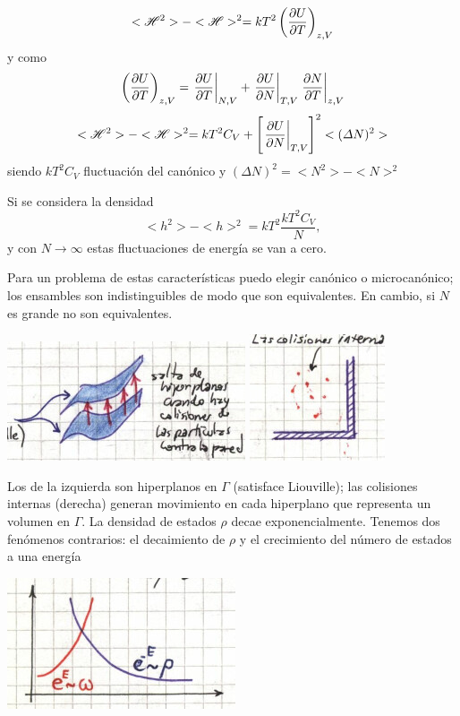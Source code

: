 \documentclass[10pt,oneside]{CBFT_book}
\begin{document}
\[
	<\mathscr{H}^2> - <\mathscr{H}>^2 = kT^2 \left( \frac{\partial^{\hspace{-0.05em}} {U}}{\partial {T}^{\hspace{-0.05em}}} \right)_{z,V}
\]
y como 
\[
	\left( \frac{\partial^{\hspace{-0.05em}} {U}}{\partial {T}^{\hspace{-0.05em}}} \right)_{z,V} = \left.\frac{\partial^{\hspace{-0.05em}} {U}}{\partial {T}^{\hspace{-0.05em}}}\right|_{N,V} + \left.\frac{\partial^{\hspace{-0.05em}} {U}}{\partial {N}^{\hspace{-0.05em}}}\right|_{T,V} 
	\left.\frac{\partial^{\hspace{-0.05em}} {N}}{\partial {T}^{\hspace{-0.05em}}}\right|_{z,V}
\]
\[
	<\mathscr{H}^2> - <\mathscr{H}>^2 = kT^2C_V +  \left[\left. \frac{\partial^{\hspace{-0.05em}} {U}}{\partial {N}^{\hspace{-0.05em}}} \right|_{T,V}\right]^2 <(\Delta N)^2>
\]
siendo $ kT^2C_V $ fluctuación del canónico y $(\Delta N)^2 = <N^2> - <N>^2 $

Si se considera la densidad
\[
	< h^2 > - < h >^2 = kT^2 \frac{k T^2 C_V}{N}, 
\]
y con $ N \to \infty $ estas fluctuaciones de energía se van a cero.

Para un problema de estas características puedo elegir canónico o microcanónico; los ensambles son
indistinguibles de modo que son equivalentes. En cambio, si $N$ es grande no son equivalentes.

\includegraphics[scale=0.5]{images/1606329307.jpg} 
\includegraphics[scale=0.5]{images/1606329311.jpg}

Los de la izquierda son hiperplanos en $\Gamma$ (satisface Liouville); las colisiones internas (derecha)
generan movimiento en cada hiperplano que representa un volumen en $\Gamma$.
La densidad de estados $\rho$ decae exponencialmente. Tenemos dos fenómenos contrarios:
el decaimiento de $\rho$ y el crecimiento del número de estados a una energía

\includegraphics[scale=0.5]{images/1606329317.jpg}
\end{document}
